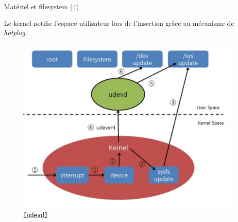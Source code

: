 \documentclass[12pt, t]{beamer}
\newcommand{\src}[2]{\vspace{-10pt}\caption{\href{#1}{\centering \tt \tiny [#2]}}}
\begin{document}
\begin{frame}{Matériel et filesystem (4)}

    \vspace{10pt}
    Le kernel notifie l'espace utilisateur lors de l'insertion grâce au
    mécanisme de {\textit{hotplug}}.

    {
        \vspace{5pt}
        \begin{figure}
            \centering
            \includegraphics[scale=0.5]{udev.png}
            \src{http://hoonycream.tistory.com/entry/udev}{udevd}
        \end{figure}
    }

\end{frame}
\end{document}
